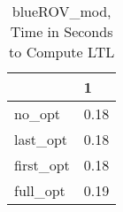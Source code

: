 \begin{table}
\caption{blueROV\_mod, Time in Seconds to Compute LTL}
\label{blueROV_mod_LTL_time}
\begin{tabular}{ll}
\toprule
 & 1 \\
\midrule
no\_opt & 0.18 \\
last\_opt & 0.18 \\
first\_opt & 0.18 \\
full\_opt & 0.19 \\
\bottomrule
\end{tabular}
\end{table}
